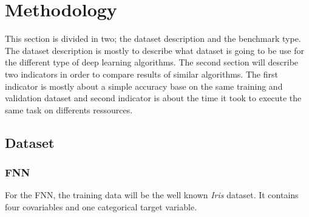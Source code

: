 \documentclass[6pt,letter]{article}\usepackage[]{graphicx}\usepackage[]{color}
\begin{document}
\section{Methodology}
This section is divided in two;  the dataset description and the benchmark type. The dataset description is mostly to describe what dataset is going to be use for the different type of deep learning algorithms. The second section will describe two indicators in order to compare results of similar algorithms. The first indicator is mostly about a simple accuracy base on the same training and validation dataset and second indicator is about the time it took to execute the same task on differents ressources.
\subsection{Dataset}
\subsubsection{FNN}
For the FNN, the training data will be the well known \textit{Iris} dataset. It contains four covariables and one categorical target variable.
\end{document}
